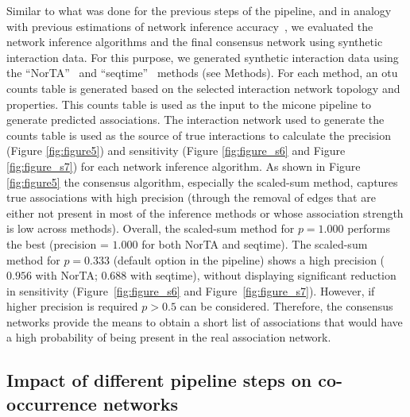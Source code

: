   Similar to what was done for the previous steps of the pipeline, and in analogy with previous estimations of network inference accuracy~\cite{Kurtz2015,Weiss2016}, we evaluated the network inference algorithms and the final consensus network using synthetic interaction data.
  For this purpose, we generated synthetic interaction data using the ``NorTA''~\cite{Kurtz2015} and ``seqtime''~\cite{faustSignaturesEcologicalProcesses2018} methods (see Methods).
  For each method, an \ac{otu} counts table is generated based on the selected interaction network topology and properties.
  This counts table is used as the input to the \ac{micone} pipeline to generate predicted associations.
  The interaction network used to generate the counts table is used as the source of true interactions to calculate the precision (Figure \ref{fig:figure5}) and sensitivity (Figure \ref{fig:figure_s6} and Figure \ref{fig:figure_s7}) for each network inference algorithm.
  As shown in Figure \ref{fig:figure5} the consensus algorithm, especially the scaled-sum method, captures true associations with high precision (through the removal of edges that are either not present in most of the inference methods or whose association strength is low across methods).
  Overall, the scaled-sum method for $p=1.000$ performs the best (precision = $1.000$ for both NorTA and seqtime).
  The scaled-sum method for $p=0.333$ (default option in the pipeline) shows a high precision ($0.956$ with NorTA; $0.688$ with seqtime), without displaying significant reduction in sensitivity (Figure~\ref{fig:figure_s6} and Figure~\ref{fig:figure_s7}).
  However, if higher precision is required $p>0.5$ can be considered.
  Therefore, the consensus networks provide the means to obtain a short list of associations that would have a high probability of being present in the real association network.

  \FloatBarrier

  \subsection*{Impact of different pipeline steps on co-occurrence networks}

